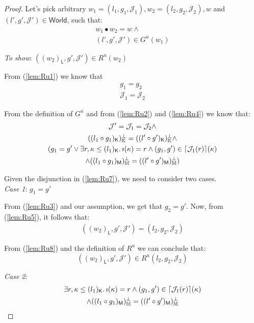 {\parindent0pt
\begin{proof}
Let's pick arbitrary $w_1 = (l_1, g_1, \mathcal{J}_1), w_2 = (l_2, g_2, \mathcal{J}_2), w$ and $(l', g', \mathcal{J}') \in \mathsf{World}$, such that:
\begin{gather}
	\label{lem:Ru1} w_1 \bullet w_2 = w \land \\
	\label{lem:Ru2} (l', g', \mathcal{J}') \in G^u(w_1)
\end{gather}

\textit{To show}: $((w_2)_\mathsf{L}, g', \mathcal{J}') \in R^u(w_2)$

From (\ref{lem:Ru1}) we know that
\begin{gather}
	\label{lem:Ru3} g_1 = g_2 \\
	\label{lem:Ru4} \mathcal{J}_1 = \mathcal{J}_2
\end{gather}

From the definition of $G^u$ and from (\ref{lem:Ru2}) and (\ref{lem:Ru4}) we know that:
\begin{gather}
	\label{lem:Ru5} \mathcal{J}' = \mathcal{J}_1 = \mathcal{J}_2 \land \\
	\label{lem:Ru6} ((l_1 \circ g_1)_\mathsf{K})_\mathbb{K}^\bot = ((l' \circ g')_\mathsf{K})_\mathbb{K}^\bot \land \\
		\label{lem:Ru7} (g_1 = g' \lor \exists r, \kappa \leq (l_1)_\mathsf{K} \ldotp \imath(\kappa) = r \land (g_1, g') \in \lceil \mathcal{J}_1(r) \rceil(\kappa)
		\\ \land ((l_1 \circ g_1)_\mathsf{M})_\mathbb{M}^\bot = ((l' \circ g')_\mathsf{M})_\mathbb{M}^\bot )
\end{gather}

Given the disjunction in (\ref{lem:Ru7}), we need to consider two cases. \\

\textit{Case 1}: $g_1 = g'$

From (\ref{lem:Ru3}) and our assumption, we get that $g_2 = g'$. Now, from (\ref{lem:Ru5}), it follows that:
\begin{gather}
	\label{lem:Ru8} ((w_2)_\mathsf{L}, g', \mathcal{J}') = (l_2, g_2, \mathcal{J}_2)
\end{gather}

From (\ref{lem:Ru8}) and the definition of $R^u$ we can conclude that:
\[
	((w_2)_\mathsf{L}, g', \mathcal{J}') \in R^u(l_2, g_2, \mathcal{J}_2)
\]

\textit{Case 2}:
\begin{gather}
	\label{lem:Ru9} \exists r, \kappa \leq (l_1)_\mathsf{K} \ldotp \imath(\kappa) = r \land (g_1, g') \in \lceil \mathcal{J}_1(r) \rceil(\kappa)
	\\
	\label{lem:Ru10} \land ((l_1 \circ g_1)_\mathsf{M})_\mathbb{M}^\bot = ((l' \circ g')_\mathsf{M})_\mathbb{M}^\bot
\end{gather}


\end{proof}}
